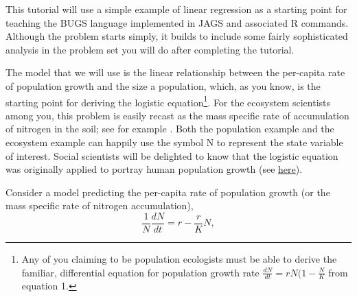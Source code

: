 \documentclass[12pt,english]{article}
\begin{document}
This tutorial will use a simple example of linear regression as a starting point for teaching the BUGS language implemented in JAGS and associated R commands. Although the problem starts simply, it builds to include some fairly sophisticated analysis in the problem set you will do after completing the tutorial. 

The model that we will use is the linear relationship between the per-capita rate of population growth and the size a population, which, as you know, is the starting point for deriving the logistic equation\footnote{Any of you claiming to be population ecologists must be able to derive the familiar, differential equation for population growth rate $\frac{dN}{dt}=rN(1-\frac{N}{K}$ from equation 1.}. For the ecosystem scientists among you, this problem is easily recast as the mass specific rate of accumulation of nitrogen in the soil; see for example \citet{Knops_Tilman}. Both the population example and the ecosystem example can happily use the symbol N to represent the state variable of interest. Social scientists will be delighted to know that the logistic equation was originally applied to portray human population growth (see \href{http://monkeysuncle.stanford.edu/?p=933}{here}). 

Consider a model predicting the per-capita rate of population growth (or the mass specific rate of nitrogen accumulation),
\begin{equation}
\frac{1}{N}\frac{dN}{dt}=r-\frac{r}{K}N,
\end{equation}
\end{document}
